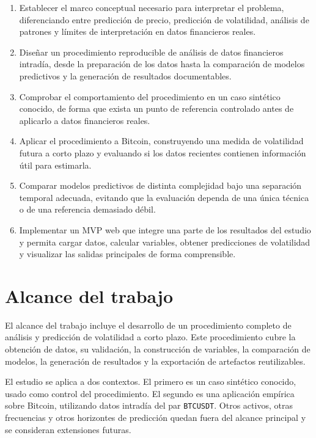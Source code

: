 \begin{enumerate}
     \item Establecer el marco conceptual necesario para interpretar el problema, diferenciando entre predicción de precio, predicción de volatilidad, análisis de patrones y límites de interpretación en datos financieros reales.
     \item Diseñar un procedimiento reproducible de análisis de datos financieros intradía, desde la preparación de los datos hasta la comparación de modelos predictivos y la generación de resultados documentables.
     \item Comprobar el comportamiento del procedimiento en un caso sintético conocido, de forma que exista un punto de referencia controlado antes de aplicarlo a datos financieros reales.
     \item Aplicar el procedimiento a Bitcoin, construyendo una medida de volatilidad futura a corto plazo y evaluando si los datos recientes contienen información útil para estimarla.
     \item Comparar modelos predictivos de distinta complejidad bajo una separación temporal adecuada, evitando que la evaluación dependa de una única técnica o de una referencia demasiado débil.
     \item Implementar un MVP web que integre una parte de los resultados del estudio y permita cargar datos, calcular variables, obtener predicciones de volatilidad y visualizar las salidas principales de forma comprensible. 
\end{enumerate}
\section{Alcance del trabajo}\label{sec:alcance}

El alcance del trabajo incluye el desarrollo de un procedimiento completo de análisis y predicción de volatilidad a corto plazo. Este procedimiento cubre la obtención de datos, su validación, la construcción de variables, la comparación de modelos, la generación de resultados y la exportación de artefactos reutilizables.

El estudio se aplica a dos contextos. El primero es un caso sintético conocido, usado como control del procedimiento. El segundo es una aplicación empírica sobre Bitcoin, utilizando datos intradía del par \texttt{BTCUSDT}. Otros activos, otras frecuencias y otros horizontes de predicción quedan fuera del alcance principal y se consideran extensiones futuras.

